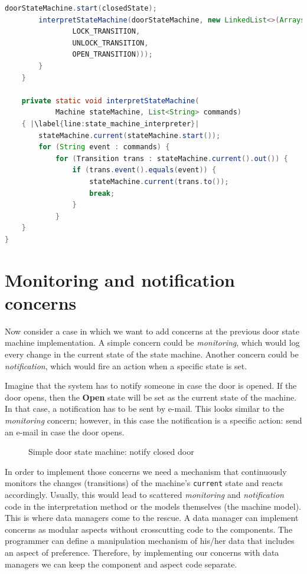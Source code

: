 \begin{sourcecode}
\begin{lstlisting}[language=Java, escapechar=|]
		doorStateMachine.start(closedState);
		interpretStateMachine(doorStateMachine, new LinkedList<>(Arrays.asList(
				LOCK_TRANSITION,
				UNLOCK_TRANSITION,
				OPEN_TRANSITION)));
		}	
	}

	private static void interpretStateMachine(
			Machine stateMachine, List<String> commands) 
	{ |\label{line:state_machine_interpreter}|
	    stateMachine.current(stateMachine.start());
		for (String event : commands) {
			for (Transition trans : stateMachine.current().out()) {
				if (trans.event().equals(event)) {
					stateMachine.current(trans.to());
					break;
				}
			}
	}
}
	\end{lstlisting}
	\caption{Door state machine}
	\label{lst:Door_state_machine}
\end{sourcecode}

\section{Monitoring and notification concerns}
Now consider a case in which we want to add concerns at the previous door state machine implementation.
A simple concern could be \textit{monitoring}, which would log every change in the current state of the state machine.
Another concern could be \textit{notification}, which would fire an action when a specific state is set.

Imagine that the system has to notify someone in case the door is opened.
If the door opens, then the \textbf{Open} state will be set as the current state of the machine.
In that case, a notification has to be sent by e-mail.
This looks similar to the \textit{monitoring} concern; however, in this case the notification is a specific action: send an e-mail in case the door opens.

\begin{figure}[H]
	\centering
  	\caption{Simple door state machine: notify closed door}
  	\label{fig:State_machine_danger}
\end{figure}

In order to implement those concerns we need a mechanism that continuously monitors the changes (transitions) of the machine's \texttt{current} state and reacts accordingly.
Usually, this would lead to scattered \textit{monitoring} and \textit{notification} code in the interpretation method or the models themselves (the machine model).
This is where data managers come to the rescue.
A data manager can implement concerns as modular aspects without crosscutting code to the components.
The programmer can define a manipulation mechanism of his/her data that includes an aspect of preference.
Therefore, by implementing our concerns with data managers we can keep the component and aspect code separate.

